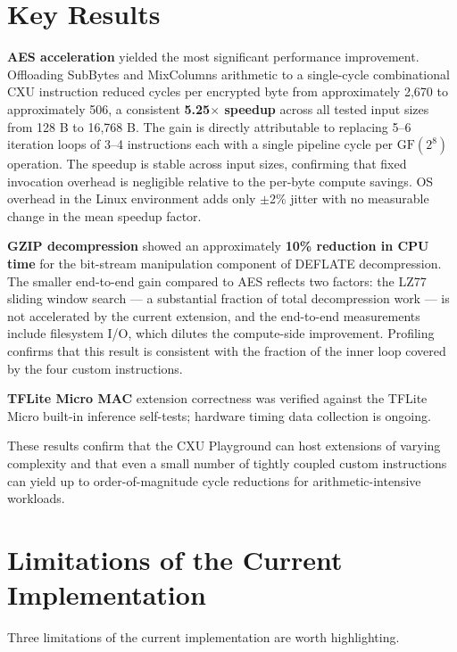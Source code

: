 \section{Key Results} %
\label{sec:key_results}

\textbf{AES acceleration} yielded the most significant performance improvement. Offloading SubBytes
and MixColumns arithmetic to a single-cycle combinational CXU instruction reduced
cycles per encrypted byte from approximately 2{,}670 to approximately 506, a
consistent \textbf{5.25$\times$ speedup} across all tested input sizes from 128 B
to 16{,}768 B. The gain is directly attributable to replacing 5--6 iteration loops
of 3--4 instructions each with a single pipeline cycle per $\text{GF}(2^8)$
operation. The speedup is stable across input sizes, confirming that fixed
invocation overhead is negligible relative to the per-byte compute savings. OS
overhead in the Linux environment adds only $\pm$2\% jitter with no measurable
change in the mean speedup factor.

\textbf{GZIP decompression} showed an approximately \textbf{10\% reduction in CPU
time} for the bit-stream manipulation component of DEFLATE decompression. The
smaller end-to-end gain compared to AES reflects two factors: the LZ77 sliding
window search --- a substantial fraction of total decompression work --- is not
accelerated by the current extension, and the end-to-end measurements include
filesystem I/O, which dilutes the compute-side improvement. Profiling confirms that
this result is consistent with the fraction of the inner loop covered by the
four custom instructions.

\textbf{TFLite Micro MAC} extension correctness was verified against the TFLite
Micro built-in inference self-tests; hardware timing data collection is ongoing.

These results confirm that the CXU Playground can host extensions of
varying complexity and that even a small number of tightly coupled custom
instructions can yield up to order-of-magnitude cycle reductions for
arithmetic-intensive workloads.
 
\section{Limitations of the Current Implementation}
\label{sec:limitations_conclusion}

Three limitations of the current implementation are worth highlighting.

